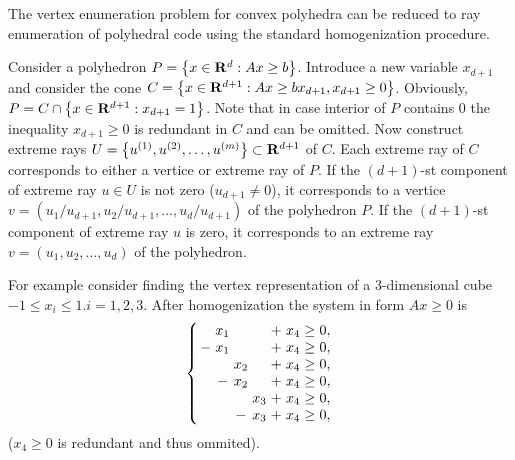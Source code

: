\documentclass{article}
\newcommand{\RR}{{\rm\bf R}}
\newcommand{\set}[1]{\left\{ #1\right\}}
\newenvironment{narrowarray}[1]{\arraycolsep=0.15em\begin{array}{#1}}{\end{array}}
\begin{document}
The vertex enumeration problem for convex polyhedra can be reduced to ray enumeration of polyhedral code using the standard homogenization procedure.

Consider a polyhedron $P = \set{x \in \RR^d: Ax \geq b}$. Introduce a new variable $x_{d+1}$ and consider the cone $C = \set{x \in \RR^{d+1}: Ax \geq bx_{d+1}, x_{d+1} \geq 0}$. Obviously, $P = C \cap \set{x \in \RR^{d+1}: x_{d+1} = 1}$. Note that in case interior of $P$ contains 0 the inequality $ x_{d+1} \geq 0$ is redundant in $C$ and can be omitted. Now construct extreme rays $U = \set{u^{(1)}, u^{(2)}, \dots, u^{(m)}} \subset \RR^{d+1}$ of $C$. Each extreme ray of $C$ corresponds to either a vertice or extreme ray of $P$. If the $(d+1)$-st component of extreme ray $u \in U$ is not zero ($u_{d+1} \neq 0$), it corresponds to a vertice $v = (u_1 / u_{d+1}, u_2 / u_{d+1}, \dots, u_d / u_{d+1})$ of the polyhedron $P$. If the $(d+1)$-st component of extreme ray $u$ is zero, it corresponds to an extreme ray $v = (u_1, u_2, \dots, u_d )$ of the polyhedron.

For example consider finding the vertex representation of a 3-dimensional cube $-1 \leq x_i \leq 1. i = 1, 2, 3$. After homogenization the system in form $Ax \geq 0$ is
$$
\left\{
\begin{narrowarray}{ccccccccccl}
 & x_1 &        &       & +& x_4 & \ge & 0, \\
-& x_1 &        &       & +& x_4 & \ge & 0, \\
 &       &  x_2 &       & +& x_4 & \ge & 0, \\
 &      -& x_2  &       & +& x_4 & \ge & 0, \\
 &       &        & x_3 & +& x_4 & \ge & 0, \\
 &       &       -& x_3 & +& x_4 & \ge & 0, \\
\end{narrowarray}
\right.
$$
($x_4 \geq 0$ is redundant and thus ommited).
\end{document}
